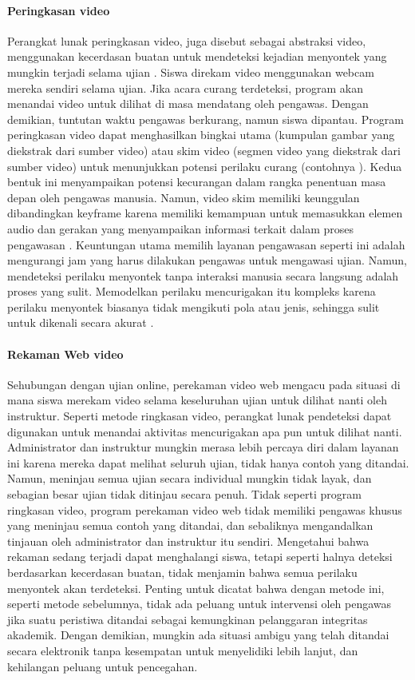 \paragraph{Peringkasan video}
\label{par:peringkasanvideo}
Perangkat lunak peringkasan video, juga disebut sebagai abstraksi video, menggunakan kecerdasan buatan untuk mendeteksi kejadian menyontek yang mungkin terjadi selama ujian \citep{truong2007video}. Siswa direkam video menggunakan webcam mereka sendiri selama ujian. Jika acara curang terdeteksi, program akan menandai video untuk dilihat di masa mendatang oleh pengawas. Dengan demikian, tuntutan waktu pengawas berkurang, namun siswa dipantau. Program peringkasan video dapat menghasilkan bingkai utama (kumpulan gambar yang diekstrak dari sumber video) atau skim video (segmen video yang diekstrak dari sumber video) untuk menunjukkan potensi perilaku curang (contohnya \citet{truong2007video}). Kedua bentuk ini menyampaikan potensi kecurangan dalam rangka penentuan masa depan oleh pengawas manusia. Namun, video skim memiliki keunggulan dibandingkan keyframe karena memiliki kemampuan untuk memasukkan elemen audio dan gerakan yang menyampaikan informasi terkait dalam proses pengawasan \citep{cote2016video}. Keuntungan utama memilih layanan pengawasan seperti ini adalah mengurangi jam yang harus dilakukan pengawas untuk mengawasi ujian. Namun, mendeteksi perilaku menyontek tanpa interaksi manusia secara langsung adalah proses yang sulit. Memodelkan perilaku mencurigakan itu kompleks karena perilaku menyontek biasanya tidak mengikuti pola atau jenis, sehingga sulit untuk dikenali secara akurat \citep{cote2016video}.

\paragraph{Rekaman Web video}
\label{par:rekamanwebvideo}

Sehubungan dengan ujian online, perekaman video web mengacu pada situasi di mana siswa merekam video selama keseluruhan ujian untuk dilihat nanti oleh instruktur. Seperti metode ringkasan video, perangkat lunak pendeteksi dapat digunakan untuk menandai aktivitas mencurigakan apa pun untuk dilihat nanti. Administrator dan instruktur mungkin merasa lebih percaya diri dalam layanan ini karena mereka dapat melihat seluruh ujian, tidak hanya contoh yang ditandai. Namun, meninjau semua ujian secara individual mungkin tidak layak, dan sebagian besar ujian tidak ditinjau secara penuh. Tidak seperti program ringkasan video, program perekaman video web tidak memiliki pengawas khusus yang meninjau semua contoh yang ditandai, dan sebaliknya mengandalkan tinjauan oleh administrator dan instruktur itu sendiri. Mengetahui bahwa rekaman sedang terjadi dapat menghalangi siswa, tetapi seperti halnya deteksi berdasarkan kecerdasan buatan, tidak menjamin bahwa semua perilaku menyontek akan terdeteksi. Penting untuk dicatat bahwa dengan metode ini, seperti metode sebelumnya, tidak ada peluang untuk intervensi oleh pengawas jika suatu peristiwa ditandai sebagai kemungkinan pelanggaran integritas akademik. Dengan demikian, mungkin ada situasi ambigu yang telah ditandai secara elektronik tanpa kesempatan untuk menyelidiki lebih lanjut, dan kehilangan peluang untuk pencegahan.

